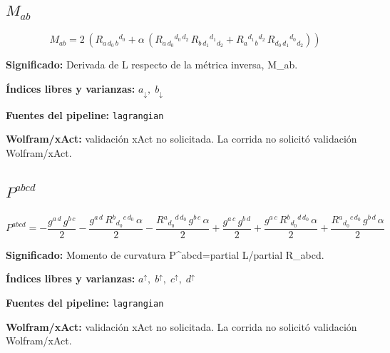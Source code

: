 \documentclass[11pt]{article}
\begin{document}
\subsection*{$ M_{ab} $}
\begin{dmath*}[breakdepth={5}]
M_{ab} = 2\,\left(R{}_{a\,d_{0}\,b}{}^{d_{0}} + \alpha\,\left(R{}_{a\,d_{0}}{}^{d_{0}\,d_{2}}\,R{}_{b\,d_{1}}{}^{d_{1}}{}_{d_{2}} + R{}_{a}{}^{d_{1}}{}_{b}{}^{d_{2}}\,R{}_{d_{0}\,d_{1}}{}^{d_{0}}{}_{d_{2}}\right)\right)
\end{dmath*}
\par\vspace{1.2\baselineskip}\noindent
\begin{minipage}{\linewidth}
\textbf{Significado:} Derivada de L respecto de la métrica inversa, M\_ab.\par
\textbf{Índices libres y varianzas:} $ a_{\downarrow},\;b_{\downarrow} $\par
\textbf{Fuentes del pipeline:} \texttt{lagrangian}\par
\textbf{Wolfram/xAct:} validación xAct no solicitada. La corrida no solicitó validación Wolfram/xAct.\par
\end{minipage}
\subsection*{$ P^{abcd} $}
\begin{dmath*}[breakdepth={5}]
P^{abcd} = -\frac{g{}^{a\,d}\,g{}^{b\,c}}{2} - \frac{g{}^{a\,d}\,R{}^{b}{}_{d_{0}}{}^{c\,d_{0}}\,\alpha}{2} - \frac{R{}^{a}{}_{d_{0}}{}^{d\,d_{0}}\,g{}^{b\,c}\,\alpha}{2} + \frac{g{}^{a\,c}\,g{}^{b\,d}}{2} + \frac{g{}^{a\,c}\,R{}^{b}{}_{d_{0}}{}^{d\,d_{0}}\,\alpha}{2} + \frac{R{}^{a}{}_{d_{0}}{}^{c\,d_{0}}\,g{}^{b\,d}\,\alpha}{2}
\end{dmath*}
\par\vspace{1.2\baselineskip}\noindent
\begin{minipage}{\linewidth}
\textbf{Significado:} Momento de curvatura P^{abcd}=partial L/partial R\_abcd.\par
\textbf{Índices libres y varianzas:} $ a^{\uparrow},\;b^{\uparrow},\;c^{\uparrow},\;d^{\uparrow} $\par
\textbf{Fuentes del pipeline:} \texttt{lagrangian}\par
\textbf{Wolfram/xAct:} validación xAct no solicitada. La corrida no solicitó validación Wolfram/xAct.\par
\end{minipage}
\end{document}
